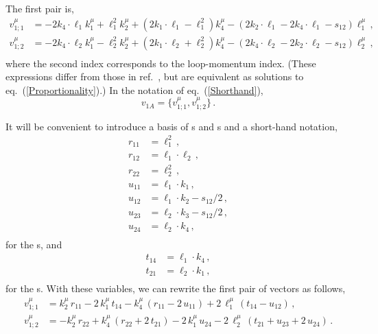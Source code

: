 \documentclass[aps,prd,preprint,groupedaddress,nofootinbib,showpacs,eqsecnum]{revtex4}
\def\eqn#1{eq.~(\ref{#1})}
\begin{document}
The first pair is,
\begin{equation}
\begin{aligned}
v_{1;1}^\mu &=
-2 k_{4}\!\cdot\!\ell_{1}k_{1}^\mu+\ell_{1}^2k_{2}^\mu
+(2 k_{1}\!\cdot\!\ell_{1}-\ell_{1}^2)k_{4}^\mu
-(2 k_{2}\!\cdot\!\ell_{1}-2 k_{4}\!\cdot\!\ell_{1}-s_{12})\ell_{1}^\mu
\,,\\
v_{1;2}^\mu &=
-2 k_{4}\!\cdot\!\ell_{2}k_{1}^\mu-\ell_{2}^2k_{2}^\mu
+(2 k_{1}\!\cdot\!\ell_{2}+\ell_{2}^2)k_{4}^\mu
-(2 k_{4}\!\cdot\!\ell_{2}-2 k_{2}\!\cdot\!\ell_{2}-s_{12})\ell_{2}^\mu
\,,\\
\end{aligned}
\label{MasslessDoubleBoxVector1o}
\end{equation}
where the second index corresponds to the loop-momentum index.
(These expressions differ from those in ref.~\cite{IBPGeneratingVectors},
but are equivalent as solutions to \eqn{Proportionality}.)
In the notation of \eqn{Shorthand},
\begin{equation}
v_{1A} = \{v_{1;1}^\mu, v_{1;2}^\mu\}\,.
\end{equation}

It will be convenient to introduce a basis of \RI{}s and \II{}s and
a short-hand notation,
\begin{equation}
\begin{aligned}
r_{11} &= \ell_1^2\,,\\
r_{12} &= \ell_1\cdot \ell_2\,,\\
r_{22} &= \ell_2^2\,,\\
u_{11} &= \ell_1\cdot k_1\,,\\
u_{12} &= \ell_1\cdot k_2-s_{12}/2\,,\\
u_{23} &= \ell_2\cdot k_3-s_{12}/2\,,\\
u_{24} &= \ell_2\cdot k_4\,,\\
\end{aligned}
\label{ReducibleInvariantShorthand}
\end{equation}
for the \PRI{}s, and
\begin{equation}
\begin{aligned}
t_{14} &= \ell_1\cdot k_4\,,\\
t_{21} &= \ell_2\cdot k_1\,,\\
\end{aligned}
\label{IrreducibleInvariantShorthand}
\end{equation}
for the \II{}s.
With these variables, we can rewrite the first pair of vectors as follows,
\begin{equation}
\begin{aligned}
v_{1;1}^\mu &= 
k_{2}^\mu\,r_{11}-2\,k_{1}^\mu\,t_{14}
-k_{4}^\mu\,(r_{11}-2\,u_{11})
+2\,\ell_1^\mu\,(t_{14}-u_{12})
\,,\\
v_{1;2}^\mu &= 
-k_{2}^\mu\,r_{22}+k_{4}^\mu\,(r_{22}+2\,t_{21})
-2\,k_{1}^\mu\,u_{24}
-2\,\ell_2^\mu\,(t_{21}+u_{23}+2\,u_{24})
\,.
\end{aligned}
\label{MasslessDoubleBoxVector1}
\end{equation}
\end{document}

